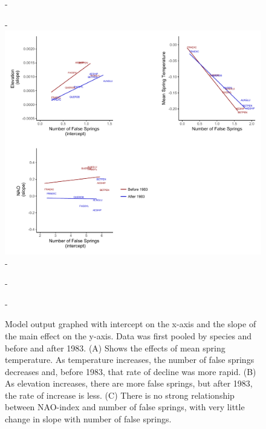 \documentclass{article}\usepackage[]{graphicx}\usepackage[]{color}
\begin{document}
{\begin{figure} [H]
  -\begin{center}
  -\includegraphics[width=12cm]{..//figures/Hadley_brms.pdf}
  -\caption{Model output graphed with intercept on the x-axis and the slope of the main effect on the y-axis. Data was first pooled by species and before and after 1983. (A) Shows the effects of mean spring temperature. As temperature increases, the number of false springs decreases and, before 1983, that rate of decline was more rapid. (B) As elevation increases, there are more false springs, but after 1983, the rate of increase is less. (C) There is no strong relationship between NAO-index and number of false springs, with very little change in slope with number of false springs.}\label{fig:hadbrms}
  -\end{center}
  -\end{figure}}
  
\end{document}
